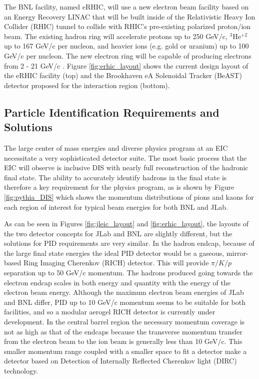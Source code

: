 The BNL facility, named eRHIC, will use a new electron beam facility based on an Energy Recovery LINAC that will be built inside of the Relativistic Heavy Ion Collider (RHIC) tunnel to collide with RHIC's pre-existing polarized proton/ion beam. The existing hadron ring will accelerate protons up to 250 GeV/c, $^3$He$^{+2}$ up to 167 GeV/c per nucleon, and heavier ions (e.g. gold or uranium) up to 100 GeV/c per nucleon. The new electron ring will be capable of producing electrons from 2 - 21 GeV/c \cite{eRHICdesign}. Figure \ref{fig:erhic_layout} shows the current design layout of the eRHIC facility (top) and the Brookhaven eA Solenoidal Tracker (BeAST) detector proposed for the interaction region (bottom).

\subsection{Particle Identification Requirements and Solutions}
The large center of mass energies and diverse physics program at an EIC necessitate a very sophisticated detector suite. The most basic process that the EIC will observe is inclusive DIS with nearly full reconstruction of the hadronic final state. The ability to accurately identify hadrons in the final state is therefore a key requirement for the physics program, as is shown by Figure \ref{fig:pythia_DIS} which shows the momentum distributions of pions and kaons for each region of interest for typical beam energies for both BNL and JLab.

As can be seen in Figures \ref{fig:jleic_layout} and \ref{fig:erhic_layout}, the layouts of the two detector concepts for JLab and BNL are slightly different, but the solutions for PID requirements are very similar. In the hadron endcap, because of the large final state energies the ideal PID detector would be a gaseous, mirror-based Ring Imaging Cherenkov (RICH) detector. This will provide $\pi/K/p$ separation up to 50 GeV/c momentum. The hadrons produced going towards the electron endcap scales in both energy and quantity with the energy of the electron beam energy. Although the maximum electron beam energies of JLab and BNL differ, PID up to 10 GeV/c momentum seems to be suitable for both facilities, and so a modular aerogel RICH detector is currently under development. In the central barrel region the necessary momentum coverage is not as high as that of the endcaps because the transverse momentum transfer from the electron beam to the ion beam is generally less than 10 GeV/c. This smaller momentum range coupled with a smaller space to fit a detector make a detector based on Detection of Internally Reflected Cherenkov light (DIRC) technology.

